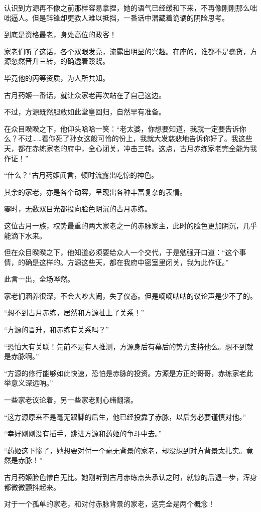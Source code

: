 \begin{this_body}
认识到方源再不像之前那样容易拿捏，她的语气已经缓和下来，不再像刚刚那么咄咄逼人。但是辞锋却更教人难以抵挡，一番话中潜藏着诡谲的阴险思考。

到底是资格最老，身处高位的政客！

家老们听了这话，各个双眼发亮，流露出明显的兴趣。在座的，谁都不是蠢货，方源忽然晋升三转，的确透着蹊跷。

毕竟他的丙等资质，为人所共知。

古月药姬一番话，就让众家老再次站在了自己这边。

不过，方源既然胆敢如此堂皇回归，自然早有准备。

在众目睽睽之下，他仰头哈哈一笑：“老太婆，你想要知道，我就一定要告诉你么？不过……看你死了孙女这般可怜的份上，我就大发慈悲地告诉你好了。我这些天，都在赤练家老的府中，全心闭关，冲击三转。这点，古月赤练家老完全能为我作证！”

“什么？”古月药姬闻言，顿时流露出吃惊的神色。

其余的家老，亦是各个动容，呈现出各种丰富复杂的表情。

霎时，无数双目光都投向脸色阴沉的古月赤练。

这位古月一族，权势最重的两大家老之一的赤脉家主，此时的脸色更加阴沉，几乎能滴下水来。

但在众目睽睽之下，他知道必须要给众人一个交代，于是勉强开口道：“这个事情，的确是这样的。方源这些天，都在我府中密室里闭关，我为此作证。”

此言一出，全场哗然。

家老们涵养很深，不会大吵大闹，失了仪态。但是嘀嘀咕咕的议论声是少不了的。

“想不到古月赤练，居然和方源扯上了关系！”

“方源的晋升，和赤练有关系吗？”

“恐怕大有关联！先前不是有人推测，方源身后有幕后的势力支持他么。想不到就是赤脉啊。”

“方源的修行能够如此快速，恐怕是赤脉的投资。方源是方正的哥哥，赤练家老此举意义深远呐。”

一些家老议论着，另一些家老则心绪翻滚。

“这方源原来不是毫无跟脚的后生，他已经投靠了赤脉，以后务必要谨慎对他。”

“幸好刚刚没有插手，跳进方源和药姬的争斗中去。”

“药姬这下惨了，她想要对付一个毫无背景的家老，却没想到对方背景太扎实。竟然是赤脉！”

古月药姬脸色惨白无比。她刚听到古月赤练点头承认之时，就惊的后退一步，浑身都微微颤抖起来。

对于一个孤单的家老，和对付赤脉背景的家老，这完全是两个概念！

\end{this_body}

